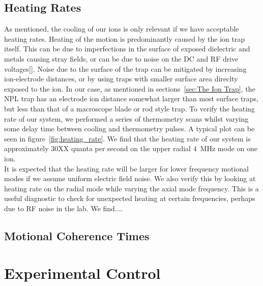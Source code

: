 \documentclass[12pt]{report}
\begin{document}
\subsection{Heating Rates}
    As mentioned, the cooling of our ions is only relevant if we have acceptable
    heating rates. Heating of the motion is predominantly caused by the ion trap
    itself. This can be due to imperfections in the surface of exposed
    dielectric and metals causing stray fields, or can be due to noise on the DC
    and RF drive voltages[]. Noise due to the surface of the trap can be
    mitigated by increasing ion-electrode distances, or by using traps with
    smaller surface area direclty exposed to the ion. In our case, as mentioned
    in sections~\ref{sec:The Ion Trap}, the NPL trap has an electrode ion
    distance somewhat larger than most surface traps, but less than that of a
    macroscope blade or rod style trap. To verify the heating rate of our
    system, we performed a series of thermometry scans whilst varying some delay
    time between cooling and thermometry pulses. A typical plot can be seen in
    figure~\ref{fig:heating_rate}. We find that the heating rate of our system
    is approximately $30$XX quanta per second on the upper radial 4~MHz mode on
    one ion.\\
    It is expected that the heating rate will be larger for lower frequency
    motional modes if we assume uniform electric field noise. We also verify
    this by looking at heating rate on the radial mode while varying the axial
    mode frequency. This is a useful diagnostic to check for unexpected heating
    at certain frequencies, perhaps due to RF noise in the lab. We find....\\

\subsection{Motional Coherence Times}

\section{Experimental Control}
\label{sec:Experimental Control}
\end{document}
